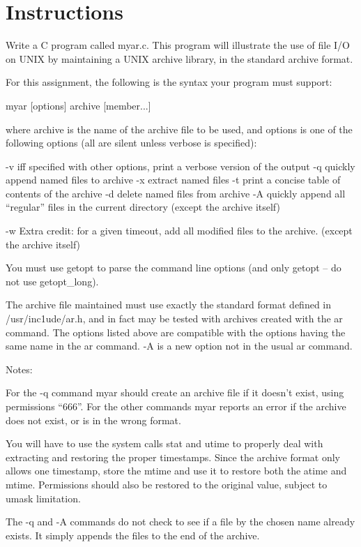 \documentclass[letterpaper,10pt]{article}
\begin{document}
\newpage

\section*{Instructions}
Write a C program called myar.c. This program will illustrate the use of file
I/O on UNIX by maintaining a UNIX archive library, in the standard archive
format.

For this assignment, the following is the syntax your program must support:

myar [options] archive [member...]

where archive is the name of the archive file to be used, and options is one of
the following options (all are silent unless verbose is specified):

-v  iff specified with other options, print a verbose version of the output
-q  quickly append named files to archive    
-x  extract named files      
-t  print a concise table of contents of the archive     
-d  delete named files from archive      
-A  quickly append all ``regular'' files in the current directory   (except the
    archive itself)

-w  Extra credit: for a given timeout, add all modified files to the archive.
    (except the archive itself)

You must use getopt to parse the command line options (and only getopt -- do
not use getopt\_long).

The archive file maintained must use exactly the standard format defined in
/usr/inc1ude/ar.h, and in fact may be tested with archives created with the ar
command. The options listed above are compatible with the options having the
same name in the ar command. -A is a new option not in the usual ar command.

Notes:

    For the -q command myar should create an archive file if it doesn't exist,
    using permissions ``666''. For the other commands myar reports an error if
    the archive does not exist, or is in the wrong format.

    You will have to use the system calls stat and utime to properly deal with
    extracting and restoring the proper timestamps. Since the archive format
    only allows one timestamp, store the mtime and use it to restore both the
    atime and mtime. Permissions should also be restored to the original value,
    subject to umask limitation.

    The -q and -A commands do not check to see if a file by the chosen name
    already exists. It simply appends the files to the end of the archive.
\end{document}
